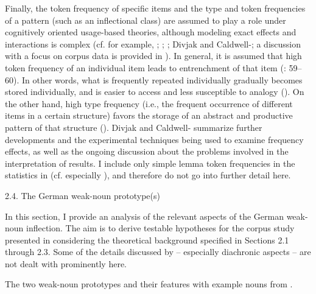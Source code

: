\begin{styleMoutonText}
Finally, the token frequency of specific items and the type and token frequencies of a pattern (such as an inflectional class) are assumed to play a role under cognitively oriented usage-based theories, although modeling exact effects and interactions is complex (cf. for example, \citealt{Bybee1985}; \citealt{Langacker1987}; \citealt{Schmid2010a}; Divjak and Caldwell-\citealt{Harris2015}; a discussion with a focus on corpus data is provided in \citealt{Schmid2010b}). In general, it is assumed that high token frequency of an individual item leads to entrenchment of that item (\citealt{Langacker1987}: 59–60). In other words, what is frequently repeated individually gradually becomes stored individually, and is easier to access and less susceptible to analogy (\citealt{BybeeHopper2001}). On the other hand, high type frequency (i.e., the frequent occurrence of different items in a certain structure) favors the storage of an abstract and productive pattern of that structure (\citealt{BybeeThompson2000}). Divjak and Caldwell-\citet{Harris2015} summarize further developments and the experimental techniques being used to examine frequency effects, as well as the ongoing discussion about the problems involved in the interpretation of results. I include only simple lemma token frequencies in the statistics in  (cf. especially ), and therefore do not go into further detail here.
\end{styleMoutonText}

\begin{styleMoutonHeadingii}
2.4. The German weak-noun prototype(s)
\end{styleMoutonHeadingii}

\begin{styleMoutonText}
In this section, I provide an analysis of the relevant aspects of the German weak-noun inflection. The aim is to derive testable hypotheses for the corpus study presented in  considering the theoretical background specified in Sections 2.1 through 2.3. Some of the details discussed by \citet{Köpcke1995} – especially diachronic aspects – are not dealt with prominently here.
\end{styleMoutonText}

\begin{styleMoutonCaption}%
\begin{table}
\caption{ The two weak-noun prototypes and their features with example nouns from \citet[178]{Köpcke1995}.}
\label{tab:2}
\end{table}\end{styleMoutonCaption}

